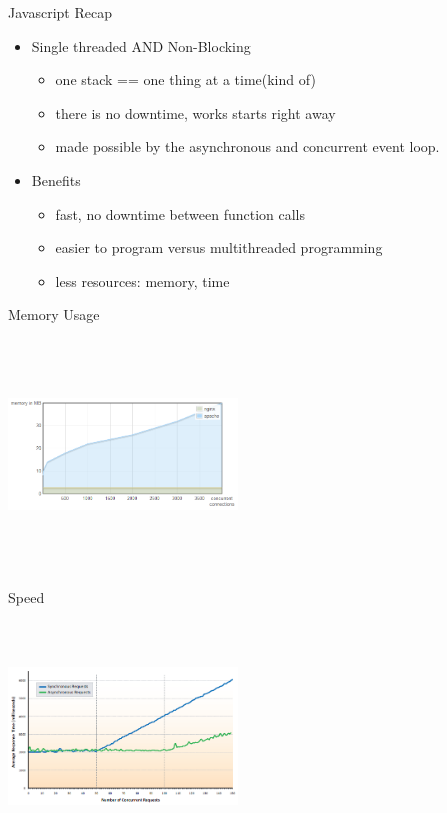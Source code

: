 \documentclass{beamer}
\begin{document}
\begin{frame}{Javascript Recap}{}
	\begin{itemize}
		\item Single threaded AND Non-Blocking
		\pause
		\begin{itemize}
			\item one stack == one thing at a time(kind of)
			\pause
			\item there is no downtime, works starts right away
			\pause
			\item made possible by the asynchronous and concurrent event loop.
			\pause
		\end{itemize}
		\item Benefits
		\pause
		\begin{itemize}
			\item fast, no downtime between function calls
			\pause
			\item easier to program versus multithreaded programming
			\pause
			\item less resources: memory, time
		\end{itemize}
	\end{itemize}
\end{frame}

\begin{frame}{Memory Usage}
	\begin{center}
		\includegraphics[width=230px, height=230px]{nginx-apache-memory.png}
	\end{center}
\end{frame}

\begin{frame}{Speed}
	\begin{center}
		\includegraphics[width=230px, height=230px]{image.png}
	\end{center}
\end{frame}
\end{document}
